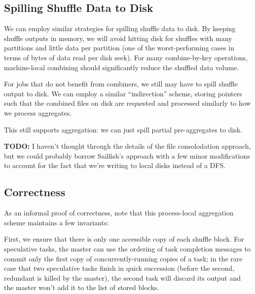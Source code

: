 \documentclass[12pt]{article}
\begin{document}
\subsection{Spilling Shuffle Data to Disk}

We can employ similar strategies for spilling shuffle data to disk.  By
keeping shuffle outputs in memory, we will avoid hitting disk for shuffles
with many partitions and little data per partition (one of the
worst-performing cases in terms of bytes of data read per disk seek).  For
many combine-by-key operations, machine-local combining should significantly
reduce the shuffled data volume.

For jobs that do not benefit from combiners, we still may have to spill
shuffle output to disk.  We can employ a similar ``indirection''
scheme, storing pointers such that the combined files on disk are requested
and processed similarly to how we process aggregates.

This still supports aggregation: we can just spill partial pre-aggregates to
disk.

\textbf{TODO:} I haven't thought through the details of the file consolodation
approach, but we could probably borrow Sailfish's approach with a few minor
modifications to account for the fact that we're writing to local disks
instead of a DFS.


\subsection{Correctness}

As an informal proof of correctness, note that this process-local aggregation
scheme maintains a few invariants:

First, we ensure that there is only one accessible copy of each shuffle block.
For speculative tasks, the master can use the ordering of task completion
messages to commit only the first copy of concurrently-running copies of
a task; in the rare case that two speculative tasks finish in quick succession
(before the second, redundant is killed by the master), the second task will
discard its output and the master won't add it to the list of stored blocks.
\end{document}
